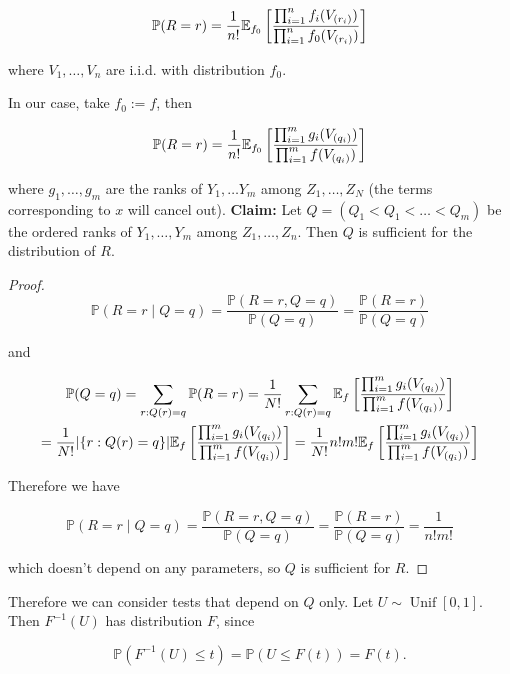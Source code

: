 \begin{example}
\begin{theorem}
\[
\mathbb{P}(R = r) = \frac{1}{n!} \E_{f_0} \left[ \frac{ \prod_{i=1}^n f_i(V_{(r_i)}) }{  \prod_{i=1}^n f_0(V_{(r_i)}) }  \right]
\]

where \(V_1, \ldots, V_n\) are i.i.d. with distribution \(f_0\).

\end{theorem}

In our case, take \(f_0 := f\), then 

\[
\mathbb{P}(R = r) = \frac{1}{n!} \E_{f_0} \left[ \frac{ \prod_{i=1}^m g_i(V_{(q_i)}) }{  \prod_{i=1}^m f(V_{(q_i)}) }  \right]
\]

where \(g_1, \ldots, g_m\) are the ranks of \(Y_1, \ldots Y_m\) among \(Z_1, \ldots, Z_N\) (the terms corresponding to \(x\) will cancel out). \textbf{Claim:} Let \(Q = (Q_1 < Q_1 < \ldots < Q_m)\) be the ordered ranks of \(Y_1, \ldots, Y_m\) among \(Z_1, \ldots, Z_n\). Then \(Q\) is sufficient for the distribution of \(R\). 

\begin{proof}

\[
\mathbb{P}(R = r \mid Q =q) = \frac{\mathbb{P}(R = r , Q = q)}{\mathbb{P}(Q = q)} = \frac{\mathbb{P}(R = r)}{\mathbb{P}(Q = q)}
\]

and

\begin{multline*}
\mathbb{P}(Q = q) = \sum_{r: Q(r) =q} \mathbb{P}(R = r) 
= \frac{1}{N!} \sum_{r: Q(r) =q} \E_{f} \left[ \frac{ \prod_{i=1}^m g_i(V_{(q_i)}) }{  \prod_{i=1}^m f(V_{(q_i)}) }  \right]
\\ = \frac{1}{N!} | \{ r: Q(r) = q\}|\E_{f} \left[ \frac{ \prod_{i=1}^m g_i(V_{(q_i)}) }{  \prod_{i=1}^m f(V_{(q_i)}) }  \right]  = \frac{1}{N!} n! m! \E_{f} \left[ \frac{ \prod_{i=1}^m g_i(V_{(q_i)}) }{  \prod_{i=1}^m f(V_{(q_i)}) }  \right]
\end{multline*}

Therefore we have 

\[
\mathbb{P}(R = r \mid Q =q) = \frac{\mathbb{P}(R = r , Q = q)}{\mathbb{P}(Q = q)} = \frac{\mathbb{P}(R = r)}{\mathbb{P}(Q = q)}  = \frac{1}{n!m!}
\]

which doesn't depend on any parameters, so \(Q\) is sufficient for \(R\).

\end{proof}

Therefore we can consider tests that depend on \(Q\) only. Let \(U \sim \operatorname{Unif}[0,1]\). Then \(F^{-1}(U)\) has distribution \(F\), since 

\[
\mathbb{P}(F^{-1}(U) \leq t) = \mathbb{P}(U \leq F(t)) = F(t).
\]


\end{example}
